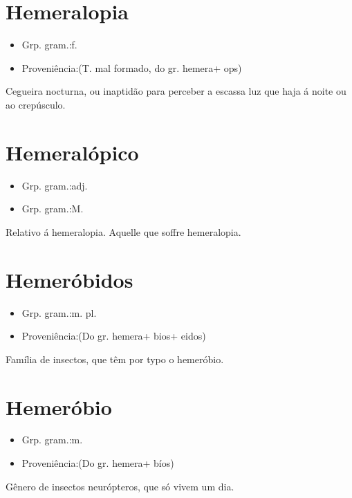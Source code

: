 \documentclass{article}
\begin{document}
\section{Hemeralopia}
\begin{itemize}
\item {Grp. gram.:f.}
\end{itemize}
\begin{itemize}
\item {Proveniência:(T. mal formado, do gr. \textunderscore hemera\textunderscore  + \textunderscore ops\textunderscore )}
\end{itemize}
Cegueira nocturna, ou inaptidão para perceber a escassa luz que haja á noite ou ao crepúsculo.
\section{Hemeralópico}
\begin{itemize}
\item {Grp. gram.:adj.}
\end{itemize}
\begin{itemize}
\item {Grp. gram.:M.}
\end{itemize}
Relativo á hemeralopia.
Aquelle que soffre hemeralopia.
\section{Hemeróbidos}
\begin{itemize}
\item {Grp. gram.:m. pl.}
\end{itemize}
\begin{itemize}
\item {Proveniência:(Do gr. \textunderscore hemera\textunderscore  + \textunderscore bios\textunderscore  + \textunderscore eidos\textunderscore )}
\end{itemize}
Família de insectos, que têm por typo o hemeróbio.
\section{Hemeróbio}
\begin{itemize}
\item {Grp. gram.:m.}
\end{itemize}
\begin{itemize}
\item {Proveniência:(Do gr. \textunderscore hemera\textunderscore  + \textunderscore bíos\textunderscore )}
\end{itemize}
Gênero de insectos neurópteros, que só vivem um dia.
\end{document}

